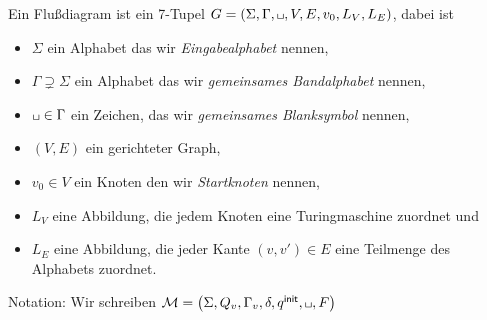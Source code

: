 % 
% 

Ein Flußdiagram ist ein 7-Tupel $G=(\Sigma, \Gamma, \blank,V,E,v_0,L_V,L_E)$, dabei ist
\begin{itemize}
 \item $\Sigma$ ein Alphabet das wir \emph{Eingabealphabet} nennen,
 \item $\Gamma\supsetneq \Sigma$ ein Alphabet das wir \emph{gemeinsames Bandalphabet} nennen,
 \item $\blank\in \Gamma$ ein Zeichen, das wir \emph{gemeinsames Blanksymbol} nennen,
 \item $(V,E)$ ein gerichteter Graph,
 \item $v_0\in V$ ein Knoten den wir \emph{Startknoten} nennen,
 \item $L_V$ eine Abbildung, die jedem Knoten eine Turingmaschine zuordnet und
 \item $L_E$ eine Abbildung, die jeder Kante $(v,v')\in E$ eine Teilmenge des Alphabets zuordnet.
\end{itemize}

Notation: Wir schreiben 
$\M=\left(\Sigma,Q_v,\Gamma_v,\delta,\qinit,\blank,F\right)$

